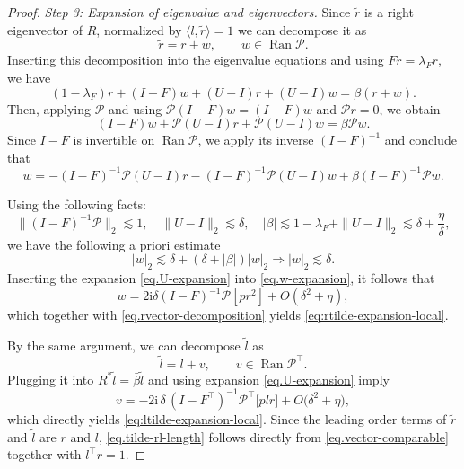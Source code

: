 \documentclass[11pt,twoside, a4paper]{article}
\numberwithin{equation}{section}
\numberwithin{figure}{section}
\theoremstyle{plain} %
\theoremstyle{definition}
\theoremstyle{remark}
\newcommand{\1} {\mspace{1 mu}}
\newcommand{\2} {\mspace{2 mu}}
\DeclareMathOperator{\Ran}{Ran}
\begin{document}
\begin{proof}
\medskip
\noindent\emph{Step 3: Expansion of eigenvalue and eigenvectors.}
Since \(\tilde r\) is a right eigenvector of $R$, normalized by $\langle l,\tilde{r}\rangle=1$
we can decompose it as
\begin{equation}\label{eq.rvector-decomposition}
\tilde r=r+w,
\qquad
w\in \Ran \mathcal{P}.  
\end{equation}
Inserting this decomposition into the eigenvalue equations and using $Fr=\lambda_Fr$, we have
\[
(1-\lambda_F)r+(I-F)w+(U-I)r+(U-I)w=\beta(r+w).
\]
Then, applying \(\mathcal{P}\) and using \(\mathcal{P}(I-F)w=(I-F)w\) and $\mathcal{P}r=0$, we obtain
\[
(I-F)w+ \mathcal{P}(U-I)r+\mathcal{P}(U-I)w=\beta \mathcal{P}w.
\]
Since \(I-F\) is invertible on $\Ran \mathcal{P}$, we apply its inverse $(I-F)^{-1}$
and conclude that
\begin{equation}\label{eq.w-expansion}
  w=-(I-F)^{-1}\mathcal{P}(U-I)r-(I-F)^{-1}\mathcal{P}(U-I)w+\beta (I-F)^{-1}\mathcal{P} w.
\end{equation}



Using the following facts:
\begin{equation}\label{eq.general-bound}
  \|(I-F)^{-1} \mathcal{P}\|_2\lesssim 1,
\quad
\|U-I\|_2\lesssim \delta,
\quad
|\beta|\lesssim 1-\lambda_F+\|U-I\|_2\lesssim\delta+\frac{\eta}{\delta},
\end{equation} 
we have the following a priori estimate
\begin{equation}\label{eq.w-order}
  |w|_2\lesssim\delta+(\delta+|\beta|)|w|_2\Longrightarrow |w|_2\lesssim\delta.
\end{equation}
Inserting the expansion \eqref{eq.U-expansion} into \eqref{eq.w-expansion}, it follows that
\begin{equation}
    w=2\mathrm i\delta (I-F)^{-1}\mathcal{P}[pr^2]+O(\delta^2+\eta),
\end{equation}
which together with \eqref{eq.rvector-decomposition} yields \eqref{eq:rtilde-expansion-local}. 

By the same argument, we can decompose $\tilde{l}$ as 
\begin{equation}\label{eq.tilde-l-decomposition}
  \tilde{l}=l+v,\qquad v\in \Ran \mathcal{P}^\top.
\end{equation}
Plugging it into $R^*\tilde{l}=\bar\beta\tilde{l}$ and using expansion \eqref{eq.U-expansion} imply
\begin{equation}\label{eq.v-expansion}
  v=-2\mathrm i\,\delta\,(I-F^\top)^{-1}\mathcal{P}^\top\bigl[plr\bigr]+O\bigl(\delta^2+\eta\bigr),
\end{equation}
which directly yields \eqref{eq:ltilde-expansion-local}.
Since the leading order terms of $\tilde{r}$ and $\tilde{l}$ are $r$ and $l$, \eqref{eq.tilde-rl-length} follows directly from \eqref{eq.vector-comparable} together with $l^\top r=1$.




\end{proof}
\end{document}
